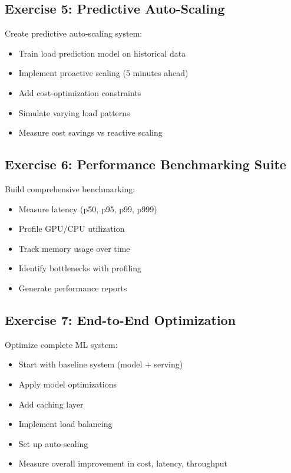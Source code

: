 \subsection{Exercise 5: Predictive Auto-Scaling}

Create predictive auto-scaling system:
\begin{itemize}
    \item Train load prediction model on historical data
    \item Implement proactive scaling (5 minutes ahead)
    \item Add cost-optimization constraints
    \item Simulate varying load patterns
    \item Measure cost savings vs reactive scaling
\end{itemize}

\subsection{Exercise 6: Performance Benchmarking Suite}

Build comprehensive benchmarking:
\begin{itemize}
    \item Measure latency (p50, p95, p99, p999)
    \item Profile GPU/CPU utilization
    \item Track memory usage over time
    \item Identify bottlenecks with profiling
    \item Generate performance reports
\end{itemize}

\subsection{Exercise 7: End-to-End Optimization}

Optimize complete ML system:
\begin{itemize}
    \item Start with baseline system (model + serving)
    \item Apply model optimizations
    \item Add caching layer
    \item Implement load balancing
    \item Set up auto-scaling
    \item Measure overall improvement in cost, latency, throughput
\end{itemize}

